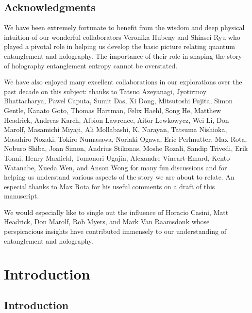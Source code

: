 \documentclass[12pt,openany]{book}
\begin{document}

\chapter{Acknowledgments}

We have been extremely fortunate to benefit from the wisdom and deep physical intuition of our wonderful collaborators  Veronika Hubeny and Shinsei Ryu who played a pivotal role in helping us develop the basic picture relating quantum entanglement and holography. The importance of their role in shaping the story of holography entanglement entropy cannot be overstated. 

We have also enjoyed many excellent collaborations in our explorations over the past decade on this subject: thanks to Tatsuo  Azeyanagi, Jyotirmoy Bhattacharya, Pawel Caputa, Sumit Das, Xi Dong, Mitsutoshi Fujita, Simon Gentle, Kanato Goto, Thomas Hartman, Felix Haehl, Song He,  Matthew Headrick, Andreas Karch, Albion Lawrence, Aitor Lewkowycz, Wei Li, Don Marolf, Masamichi Miyaji, Ali Mollabashi, K. Narayan, Tatsuma Nishioka, Masahiro Nozaki, Tokiro  Numasawa, Noriaki  Ogawa, Eric Perlmutter, Max Rota, Noburo Shiba, Joan Simon, Andrius  Stikonas, Moshe Rozali, Sandip Trivedi, Erik Tonni, Henry Maxfield, Tomonori Ugajin, Alexandre Vincart-Emard, Kento Watanabe, Xueda Wen, and Anson Wong for many fun discussions and for helping us understand various aspects of the story we are about to relate. An especial thanks to Max Rota for his useful comments on a draft of this manuscript.

We would especially like to single out the influence of Horacio Casini, Matt Headrick, Don Marolf, Rob Myers, and Mark Van Raamsdonk whose perspicacious insights have contributed immensely to our understanding of entanglement and holography. 


\newpage 
\tableofcontents
\cleardoublepage

\mainmatter

\part*{Introduction}
\label{part:intro}
\chapter{Introduction}
\label{sec:intro}
\end{document}
